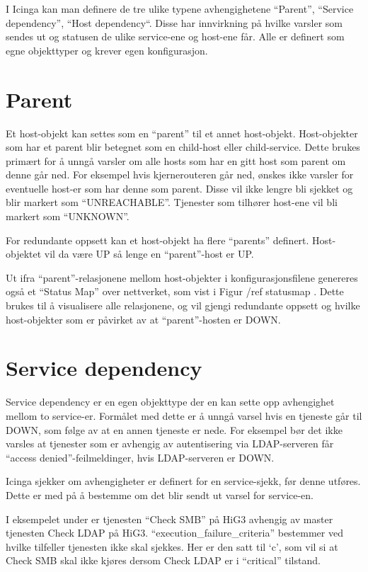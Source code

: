 I Icinga kan man definere de tre ulike typene avhengighetene “Parent”, “Service dependency”, “Host dependency“. Disse har innvirkning på hvilke varsler som sendes ut og statusen de ulike service-ene og host-ene får. Alle er definert som egne objekttyper og krever egen konfigurasjon. 

\section{Parent}
Et host-objekt kan settes som en “parent” til et annet host-objekt. Host-objekter som har et parent blir betegnet som en child-host eller child-service. Dette brukes primært for å unngå varsler om alle hosts som har en gitt host som parent om denne går ned. For eksempel hvis kjernerouteren går ned, ønskes ikke varsler for eventuelle host-er som har denne som parent. Disse vil ikke lengre bli sjekket og blir markert som “UNREACHABLE”. Tjenester som tilhører host-ene vil bli markert som “UNKNOWN”.

For redundante oppsett kan et host-objekt ha flere “parents” definert. Host-objektet vil da være UP så lenge en “parent”-host er UP.

Ut ifra “parent”-relasjonene mellom host-objekter i konfigurasjonsfilene genereres også et “Status Map” over nettverket, som vist i Figur /ref statusmap . Dette brukes til å visualisere alle relasjonene, og vil gjengi redundante oppsett og hvilke host-objekter som er påvirket av at “parent”-hosten er DOWN.

\section{Service dependency}

Service dependency er en egen objekttype der en kan sette opp avhengighet mellom to service-er. Formålet med dette er å unngå varsel hvis en tjeneste går til DOWN, som følge av at en annen tjeneste er nede. For eksempel bør det ikke varsles at tjenester som er avhengig av autentisering via LDAP-serveren får “access denied”-feilmeldinger, hvis LDAP-serveren er DOWN. 

Icinga sjekker om avhengigheter er definert for en service-sjekk, før denne utføres. Dette er med på å bestemme om det blir sendt ut varsel for service-en.

I eksempelet under er tjenesten “Check SMB” på HiG3 avhengig av master tjenesten Check LDAP på HiG3. “execution\_failure\_criteria” bestemmer ved hvilke tilfeller tjenesten ikke skal sjekkes. Her er den satt til ‘c’, som vil si at Check SMB skal ikke kjøres dersom Check LDAP er i “critical” tilstand.


